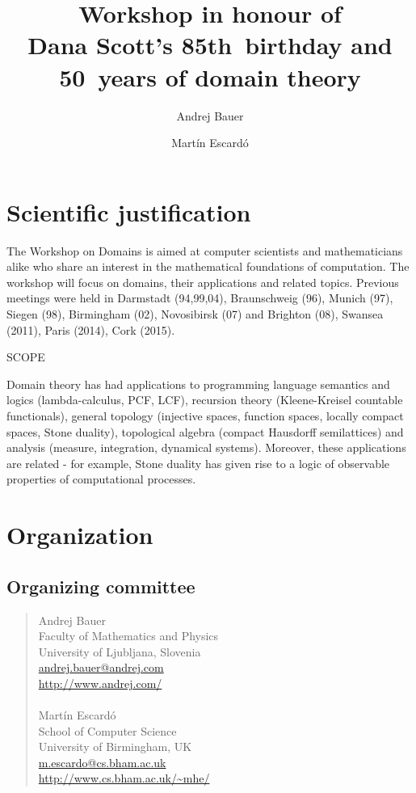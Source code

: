 \documentclass{article}
\title{Workshop in honour of\\
  Dana Scott's 85th~birthday and\\
  50~years of domain theory}
\author{Andrej Bauer \and Martín Escardó}
\date{}
\begin{document}
\maketitle

\section{Scientific justification}

The Workshop on Domains is aimed at computer scientists and
mathematicians alike who share an interest in the mathematical
foundations of computation. The workshop will focus on domains,
their applications and related topics.  Previous meetings were
held in Darmstadt (94,99,04), Braunschweig (96), Munich (97),
Siegen (98), Birmingham (02), Novosibirsk (07) and Brighton (08),
Swansea (2011), Paris (2014), Cork (2015).

SCOPE

    Domain theory has had applications to programming language
semantics and logics (lambda-calculus, PCF, LCF), recursion theory
(Kleene-Kreisel countable functionals), general topology (injective
spaces, function spaces, locally compact spaces, Stone duality),
topological algebra (compact Hausdorff semilattices) and analysis
(measure, integration, dynamical systems). Moreover, these
applications are related - for example, Stone duality has given
rise to a logic of observable properties of computational
processes.

\section{Organization}

\subsection{Organizing committee}

\begin{quote}
Andrej Bauer \\
Faculty of Mathematics and Physics \\
University of Ljubljana, Slovenia \\
\url{andrej.bauer@andrej.com} \\
\url{http://www.andrej.com/} \\
~ \\
Martín Escardó \\
School of Computer Science \\
University of Birmingham, UK \\
\url{m.escardo@cs.bham.ac.uk} \\
\url{http://www.cs.bham.ac.uk/~mhe/}
\end{quote}
\end{document}
